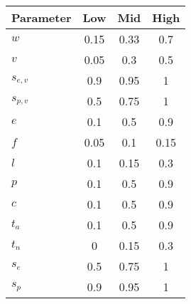 \begin{tabular}[t]{>{\ttfamily}l<{\normalfont}ccc}
\toprule
\textnormal{Parameter} & Low   & Mid   & High \\
\midrule
$w$  & 0.15  & 0.33  & 0.7 \\
$v$ & 0.05  & 0.3   & 0.5 \\
$s_{e,v}$ & 0.9   & 0.95  & 1 \\
$s_{p,v}$ & 0.5   & 0.75  & 1 \\
$e$    & 0.1   & 0.5   & 0.9 \\
$f$ & 0.05  & 0.1   & 0.15 \\
$l$ & 0.1   & 0.15  & 0.3 \\
$p$ & 0.1   & 0.5   & 0.9 \\
$c$ & 0.1   & 0.5   & 0.9 \\
$t_a$ & 0.1   & 0.5   & 0.9 \\
$t_n$ & 0     & 0.15  & 0.3 \\
$s_e$ & 0.5   & 0.75  & 1 \\
$s_p$ & 0.9   & 0.95  & 1 \\
\bottomrule
\end{tabular}%
